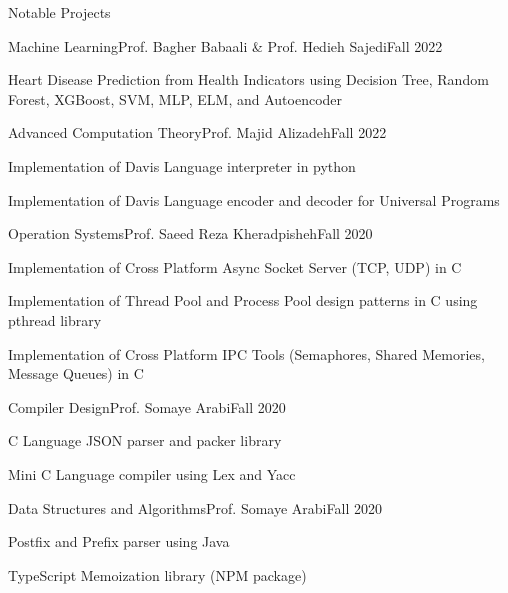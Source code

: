 \documentclass[]{main}
\begin{document}
\begin{section}{Notable Projects}
\begin{subsection}{Machine Learning}{Prof. Bagher Babaali \& Prof. Hedieh Sajedi}{Fall 2022}{}
        \item Heart Disease Prediction from Health Indicators using Decision Tree, Random Forest, XGBoost, SVM, MLP, ELM, and Autoencoder \;\href{https://github.com/ckoliber/mlexercises/blob/master/src/project.ipynb}{\faExternalLink*}
        \end{subsection}
\begin{subsection}{Advanced Computation Theory}{Prof. Majid Alizadeh}{Fall 2022}{}
        \item Implementation of Davis Language interpreter in python \;\href{https://github.com/ckoliber/actexercises/blob/master/projects/interpreter.py}{\faExternalLink*}
        \item Implementation of Davis Language encoder and decoder for Universal Programs \;\href{https://github.com/ckoliber/actexercises/blob/master/projects/encoder.py}{\faExternalLink*}
        \end{subsection}
\begin{subsection}{Operation Systems}{Prof. Saeed Reza Kheradpisheh}{Fall 2020}{}
        \item Implementation of Cross Platform Async Socket Server (TCP, UDP) in C \;\href{https://github.com/ckoliber/Knet}{\faExternalLink*}
        \item Implementation of Thread Pool and Process Pool design patterns in C using pthread library \;\href{https://github.com/ckoliber/Kprocessor}{\faExternalLink*}
        \item Implementation of Cross Platform IPC Tools (Semaphores, Shared Memories, Message Queues) in C \;\href{https://github.com/ckoliber/Kipc}{\faExternalLink*}
        \end{subsection}
\begin{subsection}{Compiler Design}{Prof. Somaye Arabi}{Fall 2020}{}
        \item C Language JSON parser and packer library \;\href{https://github.com/ckoliber/Kson}{\faExternalLink*}
        \item Mini C Language compiler using Lex and Yacc \;\href{https://github.com/ckoliber/minicc}{\faExternalLink*}
        \end{subsection}
\begin{subsection}{Data Structures and Algorithms}{Prof. Somaye Arabi}{Fall 2020}{}
        \item Postfix and Prefix parser using Java \;\href{https://github.com/ckoliber/XFixToYFix}{\faExternalLink*}
        \item TypeScript Memoization library (NPM package) \;\href{https://github.com/ckoliber/memoizor}{\faExternalLink*}

\end{subsection}
\end{section}
\end{document}
